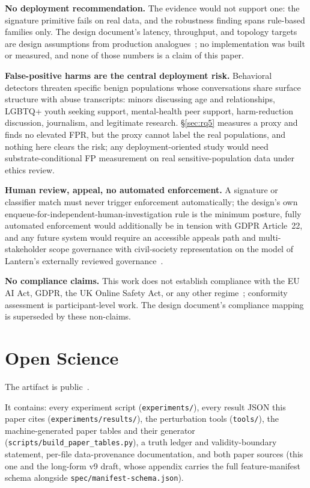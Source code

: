 \documentclass[letterpaper,twocolumn,10pt]{article}
\newif\ifanonymous
\begin{document}
\textbf{No deployment recommendation.} The evidence would not support one:
the signature primitive fails on real data, and the robustness finding
spans rule-based families only. The design document's latency, throughput,
and topology targets are design assumptions from production
analogues~\cite{photodna2023}; no implementation was built or measured, and
none of those numbers is a claim of this paper.

\textbf{False-positive harms are the central deployment risk.} Behavioral
detectors threaten specific benign populations whose conversations share
surface structure with abuse transcripts: minors discussing age and
relationships, LGBTQ+ youth seeking support, mental-health peer support,
harm-reduction discussion, journalism, and legitimate research.
\S\ref{sec:rq5} measures a proxy and finds no elevated FPR, but the proxy
cannot label the real populations, and nothing here clears the risk; any
deployment-oriented study would need substrate-conditional FP measurement on
real sensitive-population data under ethics review.

\textbf{Human review, appeal, no automated enforcement.} A signature or
classifier match must never trigger enforcement automatically; the design's
own enqueue-for-independent-human-investigation rule is the minimum posture,
fully automated enforcement would additionally be in tension with GDPR
Article~22, and any future system would require an accessible appeals path
and multi-stakeholder scope governance with civil-society representation on
the model of Lantern's externally reviewed governance~\cite{bsrhria}.

\textbf{No compliance claims.} This work does not establish compliance with
the EU AI Act, GDPR, the UK Online Safety Act, or any other
regime~\cite{euaiact2026,gpaicop2026}; conformity assessment is
participant-level work. The design document's compliance mapping is
superseded by these non-claims.

\section{Open Science}
\label{sec:openscience}

\ifanonymous
The artifact is available to reviewers via the anonymized link provided in
the submission system. %
\else
The artifact is public~\cite{artifact2026}.
\fi
It contains: every experiment script (\texttt{experiments/}), every result
JSON this paper cites (\texttt{experiments/results/}), the perturbation
tools (\texttt{tools/}), the machine-generated paper tables and their
generator (\texttt{scripts/build\_paper\_tables.py}), a truth ledger and
validity-boundary statement, per-file data-provenance documentation, and
both paper sources (this one and the long-form v9 draft, whose appendix
carries the full feature-manifest schema alongside
\texttt{spec/manifest-schema.json}).
\end{document}
